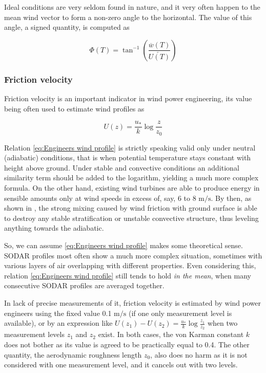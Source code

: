 \documentclass[a4paper,10pt]{book}
\begin{document}
Ideal conditions are very seldom found in nature, and it very often happen to the mean wind vector to form a non-zero angle to the horizontal. The value of this angle, a signed quantity, is computed as

\begin{equation}\label{eq:Angle to horizontal plane}
  \Phi\left( T \right) = \tan^{-1}\left( \frac{\overline{w}\left( T \right) }{\overleftarrow{U\left( T \right) }} \right) 
\end{equation}

\subsubsection{Friction velocity}

Friction velocity is an important indicator in wind power engineering, its value being often used to estimate wind profiles as

\begin{equation}\label{eq:Engineers wind profile}
  U\left( z \right) = \frac{u_{*}}{k} \log \frac{z}{z_{0}}
\end{equation}

Relation \ref{eq:Engineers wind profile} is strictly speaking valid only under neutral (adiabatic) conditions, that is when potential temperature stays constant with height above ground. Under stable and convective conditions an additional similarity term should be added to the logarithm, yielding a much more complex formula. On the other hand, existing wind turbines are able to produce energy in sensible amounts only at wind speeds in excess of, say, 6 to 8 $\mbox{m}/\mbox{s}$. By then, as shown in \cite{Oke1978}, the strong mixing caused by wind friction with ground surface is able to destroy any stable stratification or unstable convective structure, thus leveling anything towards the adiabatic.

So, we can assume \ref{eq:Engineers wind profile} makes some theoretical sense. SODAR profiles most often show a much more complex situation, sometimes with various layers of air overlapping with different properties. Even considering this, relation \ref{eq:Engineers wind profile} still tends to hold \emph{in the mean}, when many consecutive SODAR profiles are averaged together.

In lack of precise measurements of it, friction velocity is estimated by wind power engineers using the fixed value 0.1 $\mbox{m}/\mbox{s}$ (if one only measurement level is available), or by an expression like $U\left( z_{1} \right) - U\left( z_{2} \right) = \frac{u_{*}}{k} \log \frac{z_{1}}{z_{2}}$ when two measurement levels $z_{1}$ and $z_{2}$ exist. In both cases, the von Karman constant $k$ does not bother as its value is agreed to be practically equal to 0.4. The other quantity, the aerodynamic roughness length $z_{0}$, also does no harm as it is not considered with one measurement level, and it cancels out with two levels.
\end{document}
